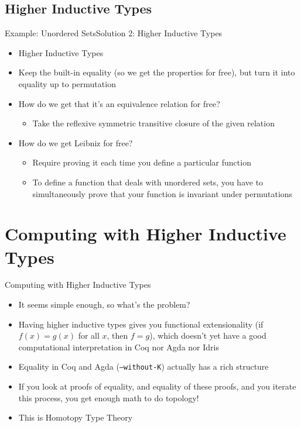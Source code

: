 \documentclass{beamer}
\begin{document}
\subsection{Higher Inductive Types}
\begin{frame}{Example: Unordered Sets}{Solution 2: Higher Inductive Types}
  \begin{itemize}
    \item Higher Inductive Types \pause
    \item Keep the built-in equality (so we get the properties for free), but turn it into equality up to permutation \pause
    \item How do we get that it's an equivalence relation for free? \pause
      \begin{itemize}
        \item Take the reflexive symmetric transitive closure of the given relation
      \end{itemize} \pause
    \item How do we get Leibniz for free? \pause
      \begin{itemize}
        \item Require proving it each time you define a particular function
        \item To define a function that deals with unordered sets,
          you have to simultaneously prove that your function is
          invariant under permutations
      \end{itemize}
  \end{itemize}
\end{frame}

\section{Computing with Higher Inductive Types}
\begin{frame}{Computing with Higher Inductive Types}
  \begin{itemize}
    \item It seems simple enough, so what's the problem? \pause
    \item Having higher inductive types gives you functional extensionality (if $f(x) = g(x)$ for all $x$, then $f = g$), which doesn't yet have a good computational interpretation in Coq nor Agda nor Idris \pause
    \item Equality in Coq and Agda (\texttt{--without-K}) actually has a rich structure \pause
    \item If you look at proofs of equality, and equality of these proofs, and you iterate this process, you get enough math to do topology! \pause
    \item This is Homotopy Type Theory
  \end{itemize}
\end{frame}
\end{document}
